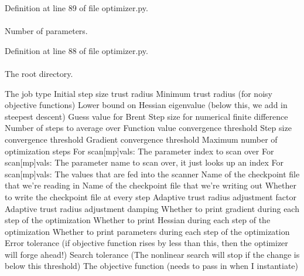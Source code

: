 \-Definition at line 89 of file optimizer.\-py.

\hypertarget{classforcebalance_1_1optimizer_1_1Optimizer_a482102f9a8fc0fa5120db5078684fb53}{
\paragraph[{np}]{}}\label{classforcebalance_1_1optimizer_1_1Optimizer_a482102f9a8fc0fa5120db5078684fb53}


\-Number of parameters. 



\-Definition at line 88 of file optimizer.\-py.

\hypertarget{classforcebalance_1_1optimizer_1_1Optimizer_ab43692f45372b27e41046aa4a40396f1}{
\paragraph[{\-Objective}]{}}\label{classforcebalance_1_1optimizer_1_1Optimizer_ab43692f45372b27e41046aa4a40396f1}


\-The root directory. 

\-The job type \-Initial step size trust radius \-Minimum trust radius (for noisy objective functions) \-Lower bound on \-Hessian eigenvalue (below this, we add in steepest descent) \-Guess value for \-Brent \-Step size for numerical finite difference \-Number of steps to average over \-Function value convergence threshold \-Step size convergence threshold \-Gradient convergence threshold \-Maximum number of optimization steps \-For scan\mbox{[}mp\mbox{]}vals\-: \-The parameter index to scan over \-For scan\mbox{[}mp\mbox{]}vals\-: \-The parameter name to scan over, it just looks up an index \-For scan\mbox{[}mp\mbox{]}vals\-: \-The values that are fed into the scanner \-Name of the checkpoint file that we're reading in \-Name of the checkpoint file that we're writing out \-Whether to write the checkpoint file at every step \-Adaptive trust radius adjustment factor \-Adaptive trust radius adjustment damping \-Whether to print gradient during each step of the optimization \-Whether to print \-Hessian during each step of the optimization \-Whether to print parameters during each step of the optimization \-Error tolerance (if objective function rises by less than this, then the optimizer will forge ahead!) \-Search tolerance (\-The nonlinear search will stop if the change is below this threshold) \-The objective function (needs to pass in when \-I instantiate) 

